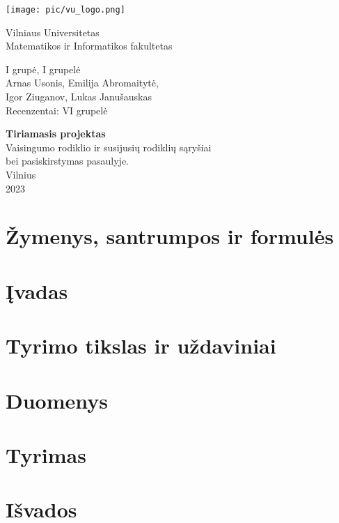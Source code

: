 \documentclass[12pt]{article}
\begin{document}
\begin{titlepage}
    \centering
    \texttt{[image: pic/vu\_logo.png]} \\
    {\Huge
    Vilniaus Universitetas \\
    Matematikos ir Informatikos fakultetas\par} 
    \vspace{2cm}
    
    \Large
    {I grupė, I grupelė \\
    Arnas Usonis, Emilija Abromaitytė, \\ Igor Ziuganov, Lukas Janušauskas \\
    Recenzentai: VI grupelė\par}
    \vspace{1cm}
    {\LARGE
    \textbf{Tiriamasis projektas \\}}
    \vspace{0.2cm}
    {\Large
    Vaisingumo rodiklio ir susijusių rodiklių sąryšiai \\ bei pasiskirstymas pasaulyje. \\}
    \vspace*{\fill}
    Vilnius \\ 2023
    
    
\end{titlepage}
\pagebreak

\normalsize
\tableofcontents
\pagebreak

\section{Žymenys, santrumpos ir formulės}

\pagebreak

\section{Įvadas}

\pagebreak

\section{Tyrimo tikslas ir uždaviniai}

\pagebreak

\section{Duomenys}

\pagebreak

\section{Tyrimas}

\pagebreak

\section{Išvados}

\end{document}
